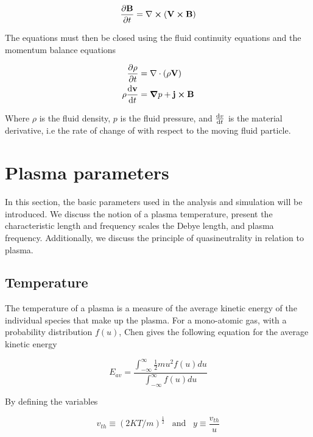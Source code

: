\begin{equation}
    \pdv{\vb{B}}{t} = \nabla \cross (\vb{V} \cross \vb{B})
\end{equation}

The equations must then be closed using the fluid continuity equations and the momentum balance equations

\begin{subequations}
    \begin{align}
        \pdv{\rho}{t} &= \nabla \cdot (\rho \vb{V}) \\
        \rho \dv{\vb{v}}{t} &= \grad{p} + \vb{j} \cross \vb{B}
    \end{align}
\end{subequations}

Where $\rho$ is the fluid density, $p$ is the fluid pressure, and $\dv{v}{t}$ is the material derivative, i.e the rate of change of with respect to the moving fluid particle.


\section{Plasma parameters}\label{subsec:pParam}
In this section, the basic parameters used in the analysis and simulation will be introduced. We discuss the notion of a plasma temperature, present the characteristic length and frequency scales the Debye length, and plasma frequency. Additionally, we discuss the principle of quasineutrality in relation to plasma. 

\subsection{Temperature}\label{subsec:temperature}
The temperature of a plasma is a measure of the average kinetic energy of the individual species that make up the plasma. For a mono-atomic gas, with a probability distribution $f(u)$, Chen  gives the following equation for the average kinetic energy

\begin{equation}\label{eq:avgEint}
    E_{av} = \frac{\int^\infty_{-\infty} \frac{1}{2} m u^2 f(u) du}{\int^\infty_{-\infty} f(u) du}
\end{equation}


By defining the variables 

\begin{equation*}
    v_{th} \equiv (2 K T / m)^{\frac{1}{2}} \hspace{10pt} \text{and} \hspace{10pt} y \equiv \frac{v_{th}}{u}
\end{equation*}
    
